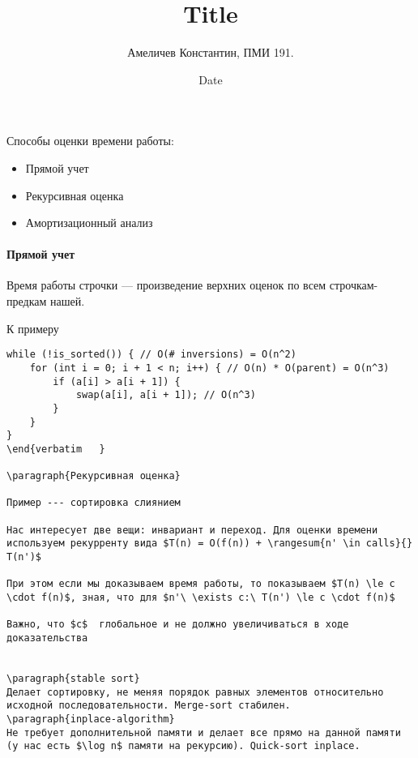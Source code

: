 \documentclass[12pt]{article}
\title{Title}
\author{Амеличев Константин, ПМИ 191.}
\date{Date}
\newcommand{\rangesum}[2]{\displaystyle \sum_{#1}^{#2}}
\begin{document}
Способы оценки времени работы:
\begin{itemize}
\item Прямой учет

\item Рекурсивная оценка

\item Амортизационный анализ
\end{itemize}

\paragraph{Прямой учет}

Время работы строчки --- произведение верхних оценок по всем строчкам-предкам нашей.

К примеру

\begin{verbatim}
while (!is_sorted()) { // O(# inversions) = O(n^2)
    for (int i = 0; i + 1 < n; i++) { // O(n) * O(parent) = O(n^3)
        if (a[i] > a[i + 1]) {
            swap(a[i], a[i + 1]); // O(n^3)
        }
    }
}
\end{verbatim	}

\paragraph{Рекурсивная оценка}

Пример --- сортировка слиянием

Нас интересует две вещи: инвариант и переход. Для оценки времени используем рекурренту вида $T(n) = O(f(n)) + \rangesum{n' \in calls}{} T(n')$ 

При этом если мы доказываем время работы, то показываем $T(n) \le c \cdot f(n)$, зная, что для $n'\ \exists c:\ T(n') \le c \cdot f(n)$

Важно, что $c$  глобальное и не должно увеличиваться в ходе доказательства


\paragraph{stable sort}
Делает сортировку, не меняя порядок равных элементов относительно исходной последовательности. Merge-sort стабилен.
\paragraph{inplace-algorithm}
Не требует дополнительной памяти и делает все прямо на данной памяти (у нас есть $\log n$ памяти на рекурсию). Quick-sort inplace.


\end{verbatim}
\end{document}
